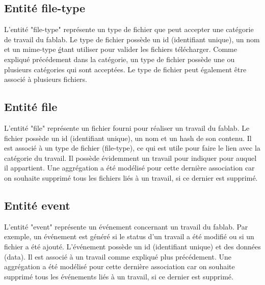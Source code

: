 \documentclass[
    iai, %
    il, %
]{heig-tb}
\begin{document}
\subsection{Entité file-type}
L'entité "file-type" représente un type de fichier que peut accepter une catégorie de travail du fablab.\newline
Le type de fichier possède un id (identifiant unique), un nom et un mime-type \href{https://developer.mozilla.org/fr/docs/Web/HTTP/Basics_of_HTTP/MIME_Types} étant utiliser pour valider les fichiers télécharger.\newline
Comme expliqué précédement dans la catégorie, un type de fichier possède une ou plusieurs catégories qui sont acceptées.\newline
Le type de fichier peut également être associé à plusieurs fichiers.

\subsection{Entité file}
L'entité "file" représente un fichier fourni pour réaliser un travail du fablab.\newline
Le fichier possède un id (identifiant unique), un nom et un hash de son contenu.\newline
Il est associé à un type de fichier (file-type), ce qui est utile pour faire le lien avec la catégorie du travail.\newline
Il possède évidemment un travail pour indiquer pour auquel il appartient.\newline
Une aggrégation a été modélisé pour cette dernière association car on souhaite supprimé tous les fichiers liés à un travail, si ce dernier est supprimé.

\subsection{Entité event}
L'entité "event" représente un événement concernant un travail du fablab. Par exemple, un événement est généré si le status d'un travail a été modifié ou si un fichier a été ajouté.\newline
L'événement possède un id (identifiant unique) et des données (data).\newline
Il est associé à un travail comme expliqué plus précédement.\newline
Une aggrégation a été modélisé pour cette dernière association car on souhaite supprimé tous les événements liés à un travail, si ce dernier est supprimé.
\end{document}
